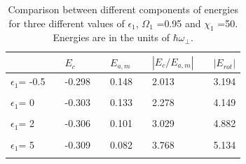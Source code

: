 \documentclass[10pt,a4paper]{article}
\begin{document}
\begin{table}
\caption {Comparison between different components of energies for
three different values of $\epsilon_1$, $\Omega_1$ =0.95 and
$\chi_1$ =50. Energies are in the units of $\hbar\omega_\perp$.}
\begin{tabular}{lllllllll}
\hline\hline
&& $E_c$ && $E_{a,m}$ && $|E_c/ E_{a,m}|$ && $|E_{rot}|$\\
\hline
 $\epsilon_1$= -0.5 && -0.298 && 0.148 && 2.013 && 3.194\\\\
\hline
 $\epsilon_1$= 0 && -0.303 && 0.133 && 2.278 && 4.149\\\\
\hline
 $\epsilon_1$= 2 && -0.306 && 0.101 && 3.029 && 4.882\\\\
\hline
 $\epsilon_1$= 5 && -0.309 && 0.082 && 3.768 && 5.134\\\\
 \hline\hline
\end{tabular}
\end{table}
\end{document}
